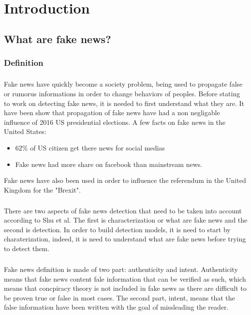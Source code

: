 
\chapter{Introduction}
\section{What are fake news?}
\subsection{Definition}
\paragraph{} Fake news have quickly become a society problem, being used to propagate false or rumorus informations in order to change behaviors of peoples. Before stating to work on detecting fake news, it is needed to first understand what they are. It have been show that propagation of fake news have had a non negligable influence of 2016 US presidential elections\cite{Allcott2017}. A few facts on fake news in the United States: 

\begin{itemize}
	\item $62\%$ of US citizen get there news for social medias\cite{gottfried2016news}
	\item Fake news had more share on facebook than mainstream news\cite{silverman2016teens}.
\end{itemize}

Fake news have also been used in order to influence the referendum in the United Kingdom for the "Brexit".

\paragraph{}There are two aspects of fake news detection that need to be taken into account according to Shu et al\cite{shu2017fake}. The first is characterization or what are fake news and the second is detection. In order to build detection models, it is need to start by charaterization, indeed, it is need to understand what are fake news before trying to detect them. 
\paragraph{}
Fake news definition is made of two part: authenticity and intent. Authenticity means that fake news content fale information that can be verified as such, which means that concpiracy theory is not included in fake news as there are difficult to be proven true or false in most cases. The second part, intent, means that the false information have been written with the goal of missleading the reader. 


